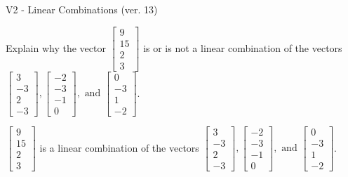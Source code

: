 \begin{exercise}
  \begin{exerciseTitle}V2 - Linear Combinations (ver. 13)\end{exerciseTitle}
  \begin{exerciseStatement}
    Explain why the vector \(\left[\begin{array}{c}
9 \\
15 \\
2 \\
3
\end{array}\right]\)  is or is not a linear 
	combination of the vectors \(\left[\begin{array}{c}
3 \\
-3 \\
2 \\
-3
\end{array}\right] , \left[\begin{array}{c}
-2 \\
-3 \\
-1 \\
0
\end{array}\right] , \text{ and } \left[\begin{array}{c}
0 \\
-3 \\
1 \\
-2
\end{array}\right]\).
	


  \end{exerciseStatement}
  \begin{exerciseAnswer}
   \(\left[\begin{array}{c}
9 \\
15 \\
2 \\
3
\end{array}\right]\) 
  	 is  
	a linear combination of the vectors \(\left[\begin{array}{c}
3 \\
-3 \\
2 \\
-3
\end{array}\right] , \left[\begin{array}{c}
-2 \\
-3 \\
-1 \\
0
\end{array}\right] , \text{ and } \left[\begin{array}{c}
0 \\
-3 \\
1 \\
-2
\end{array}\right]\).

	
  


  \end{exerciseAnswer}
\end{exercise}